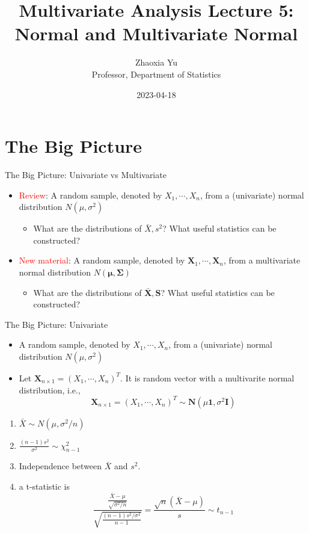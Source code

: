 \documentclass[
  ignorenonframetext,
]{beamer}
\title{Multivariate Analysis Lecture 5: Normal and Multivariate Normal}
\author{Zhaoxia Yu\\
Professor, Department of Statistics}
\date{2023-04-18}
\providecommand{\tightlist}{%
  \setlength{\itemsep}{0pt}\setlength{\parskip}{0pt}}
\begin{document}
\frame{\titlepage}

\hypertarget{the-big-picture}{%
\section{The Big Picture}\label{the-big-picture}}

\begin{frame}{The Big Picture: Univariate vs Multivariate}
\protect\hypertarget{the-big-picture-univariate-vs-multivariate}{}
\begin{itemize}
\tightlist
\item
  \textcolor{red}{Review}: A random sample, denoted by
  \(X_1, \cdots, X_n\), from a (univariate) normal distribution
  \(N(\mu, \sigma^2)\)

  \begin{itemize}
  \tightlist
  \item
    What are the distributions of \(\bar X, s^2\)? What useful
    statistics can be constructed?
  \end{itemize}
\item
  \textcolor{red}{New material}: A random sample, denoted by
  \(\mathbf X_1, \cdots, \mathbf X_n\), from a multivariate normal
  distribution \(N(\boldsymbol \mu, \boldsymbol \Sigma)\)

  \begin{itemize}
  \tightlist
  \item
    What are the distributions of \(\bar{\mathbf X}, \mathbf S\)? What
    useful statistics can be constructed?
  \end{itemize}
\end{itemize}
\end{frame}

\begin{frame}{The Big Picture: Univariate}
\protect\hypertarget{the-big-picture-univariate}{}
\begin{itemize}
\tightlist
\item
  A random sample, denoted by \(X_1, \cdots, X_n\), from a (univariate)
  normal distribution \(N(\mu, \sigma^2)\)
\item
  Let \(\mathbf X_{n\times 1}=(X_1, \cdots, X_n)^T\). It is random
  vector with a multivarite normal distribution, i.e.,
  \[\mathbf X_{n\times 1}=(X_1, \cdots, X_n)^T \sim \mathbf N(\mu\mathbf 1, \sigma^2\mathbf I)\]
\end{itemize}

\begin{enumerate}
\tightlist
\item
  \(\bar X \sim N(\mu, \sigma^2/n)\)
\item
  \(\frac{(n-1)s^2}{\sigma^2} \sim \chi_{n-1}^2\)
\item
  Independence between \(\bar X\) and \(s^2\).
\item
  a t-statistic is
  \[\frac{\frac{\bar X-\mu}{\sqrt{\sigma^2/n}}}{\sqrt{\frac{(n-1)s^2/\sigma^2}{n-1}}}=\frac{\sqrt{n}(\bar X-\mu)}{s} \sim t_{n-1}\]
\end{enumerate}
\end{frame}
\end{document}
